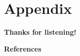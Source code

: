 \documentclass{beamer}
\begin{document}
\section{Appendix}


\begin{frame}
    \begin{center}
        \LARGE\bf Thanks for listening!
    \end{center}
\end{frame}



\begin{frame}{\bf References}
    \nocite{*} %
    
    
\end{frame}
\end{document}
